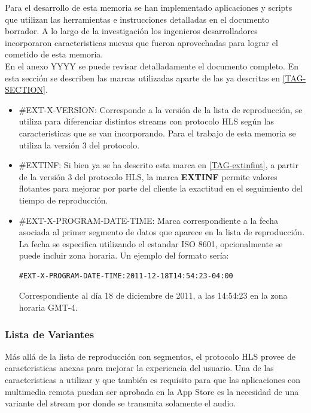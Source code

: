 Para el desarrollo de esta memoria se han implementado aplicaciones y scripts que utilizan las herramientas e instrucciones detalladas en el documento borrador. A lo largo de la investigación los ingenieros desarrolladores incorporaron caracteristicas nuevas que fueron aprovechadas para lograr el cometido de esta memoria.\\

En el anexo YYYY se puede revisar detalladamente el documento completo. En esta sección se describen las marcas utilizadas aparte de las ya descritas en \ref{TAG-SECTION}.

\begin{itemize}
\item \#EXT-X-VERSION: Corresponde a la versión de la lista de reproducción, se utiliza para diferenciar distintos streams con protocolo HLS según las caracteristicas que se van incorporando. Para el trabajo de esta memoria se utiliza la versión 3 del protocolo.

\item \#EXTINF: Si bien ya se ha descrito esta marca en \ref{TAG-extinfint}, a partir de la versión 3 del protocolo HLS, la marca \textbf{EXTINF} permite valores flotantes para mejorar por parte del cliente la exactitud en el seguimiento del tiempo de reproducción. 

\item \#EXT-X-PROGRAM-DATE-TIME: Marca correspondiente a la fecha asociada al primer segmento de datos que aparece en la lista de reproducción. La fecha se especifica utilizando el estandar ISO 8601, opcionalmente se puede incluir zona horaria. Un ejemplo del formato sería:

\begin{lstlisting}
#EXT-X-PROGRAM-DATE-TIME:2011-12-18T14:54:23-04:00
\end{lstlisting}

Correspondiente al día 18 de diciembre de 2011, a las 14:54:23 en la zona horaria GMT-4.

\end{itemize}
\subsubsection{Lista de Variantes}
Más allá de la lista de reproducción con segmentos, el protocolo HLS provee de caracteristicas anexas para mejorar la experiencia del usuario.
Una de las caracteristicas a utilizar y que también es requisito para que las aplicaciones con multimedia remota puedan ser aprobada en la App Store es la necesidad de una variante del stream por donde se transmita solamente el audio.\\

